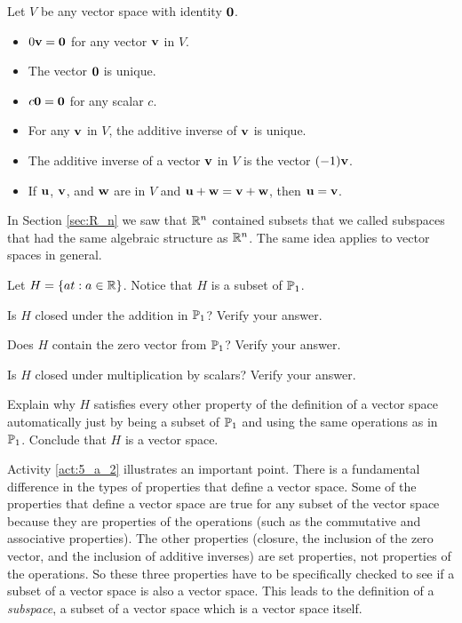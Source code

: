 \begin{theorem} Let $V$ be any vector space with identity $\mathbf{0}$. 
\begin{itemize}
\item $0 \mathbf{v} = \mathbf{0}$ for any vector $\mathbf{v}$ in $V$.  
\item The vector $\mathbf{0}$ is unique.
\item $c \mathbf{0} = \mathbf{0}$ for any scalar $c$.
\item For any $\mathbf{v}$ in $V$, the additive inverse of $\mathbf{v}$ is unique.
\item The additive inverse of a vector $\mathbf{v}$ in $V$ is the vector $(-1)\mathbf{v}$. 
\item If $\mathbf{u}$, $\mathbf{v}$, and $\mathbf{w}$ are in $V$ and $\mathbf{u} + \mathbf{w} = \mathbf{v} + \mathbf{w}$, then $\mathbf{u} = \mathbf{v}$. 
\end{itemize}
\end{theorem}



In Section \ref{sec:R_n} we saw that $\mathbb{R}^n$ contained subsets that we called subspaces that had the same algebraic structure as $\mathbb{R}^n$. The same idea applies to vector spaces in general. 



\begin{activity} \label{act:5_a_2} Let $H = \left\{ at : a \in \mathbb{R} \right\}$. Notice that $H$ is a subset of $\mathbb{P}_1$.
    \ba
    \item Is $H$ closed under the addition in $\mathbb{P}_1$? Verify your answer.

    

    \item Does $H$ contain the zero vector from $\mathbb{P}_1$? Verify your answer.

    

    \item Is $H$ closed under multiplication by scalars? Verify your answer.

    

    \item Explain why $H$ satisfies every other property of the definition of a vector space automatically just by being a subset of $\mathbb{P}_1$ and using the same operations as in $\mathbb{P}_1$. Conclude that $H$ is a vector space.



    \ea
\end{activity}



Activity \ref{act:5_a_2} illustrates an important point. There is a fundamental difference in the types of properties that define a vector space. Some of the properties that define a vector space are true for any subset of the vector space because they are properties of the operations (such as the commutative and associative properties). The other properties (closure, the inclusion of the zero vector, and the inclusion of additive inverses) are set properties, not properties of the operations. So these three properties have to be specifically checked to see if a subset of a vector space is also a vector space.  This leads to the definition of a \emph{subspace}, a subset of a vector space which is a vector space itself.

